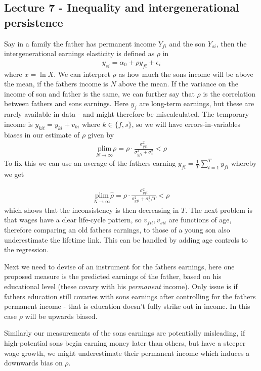 \documentclass[12pt, a4paper]{article}
\begin{document}
\begin{multicols}{2}
\subsection{Lecture 7 - Inequality and intergenerational persistence}
Say in a family the father has permanent income $Y_{fi}$ and the son $Y_{si}$, then the intergenerational earnings elasticity is defined as $\rho$ in
\begin{align*}
y_{si} = \alpha_0 + \rho y_{fi} + \epsilon_i
\end{align*}
where $x = \ln X$. We can interpret $\rho$ as how much the sons income will be above the mean, if the fathers income is $N$ above the mean. If the variance on the income of son and father is the same, we can further say that $\rho$ is the correlation between fathers and sons earnings. Here $y_f$ are long-term earnings, but these are rarely available in data - and might therefore be miscalculated. The temporary income is $y_{kit}=y_{ki}+ v_{ki}$ where $k\in\{f,s\}$, so we will have errors-in-variables biases in our estimate of $\rho$ given by
\begin{align*}
\underset{N \rightarrow \infty}{\text{plim}} \rho = \rho \cdot \frac{\sigma^2_{yfi}}{\sigma^2_{yfi}+ \sigma^2_v}<\rho
\end{align*}
To fix this we can use an average of the fathers earning $\bar{y}_{fi} = \frac{1}{T}\sum_{t=1}^T y_{fi}$ whereby we get

\begin{align*}
\underset{N \rightarrow \infty}{\text{plim}} \hat{\rho} = \rho \cdot \frac{\sigma^2_{yfi}}{\sigma^2_{yfi}+ \sigma^2_v/T}<\rho
\end{align*}
which shows that the inconsistency is then decreasing in $T$. The next problem is that wages have a clear life-cycle pattern, so $v_{fit}, v_{sit}$ are functions of age, therefore comparing an old fathers earnings, to those of a young son also underestimate the lifetime link. This can be handled by adding age controls to the regression.

Next we need to devise of an instrument for the fathers earnings, here one proposed measure is the predicted earnings of the father, based on his educational level (these covary with his \textit{permanent} income). Only issue is if fathers education still covaries with sons earnings after controlling for the fathers permanent income - that is education doesn't fully strike out in income. In this case $\rho$ will be upwards biased.

Similarly our measurements of the sons earnings are potentially misleading, if high-potential sons begin earning money later than others, but have a steeper wage growth, we might underestimate their permanent income which induces a downwards bias on $\rho$.


\end{multicols}
\end{document}

